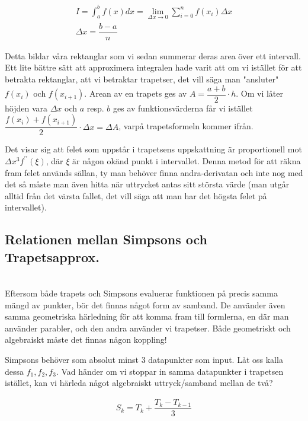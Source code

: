 \begin{equation*}
  \begin{gathered}
    I=\int_{a}^{b}f(x)dx=\lim_{\Delta x\to0}\sum_{i=0}^{n}f(x_i)\Delta x\\
    \Delta x = \dfrac{b-a}{n}
  \end{gathered}
\end{equation*}
\par\bigskip
\noindent Detta bildar våra rektanglar som vi sedan summerar deras area över ett intervall. Ett lite bättre sätt att approximera integralen hade varit att om vi istället för att betrakta rektanglar, att vi betraktar trapetser, det vill säga man "ansluter" $f(x_i)$ och $f(x_{i+1})$. Arean av en trapets ges av $A=\dfrac{a+b}{2}\cdot h$. Om vi låter höjden vara $\Delta x$ och $a$ resp. $b$ ges av funktionsvärderna får vi istället $\dfrac{f(x_i)+f(x_{i+1})}{2}\cdot\Delta x=\Delta A$, varpå trapetsformeln kommer ifrån. 
\par\bigskip
\noindent Det visar sig att felet som uppstår i trapetsens uppskattning är proportionell mot $\Delta x^3f^{\prime\prime}(\xi)$, där $\xi$ är någon okänd punkt i intervallet. Denna metod för att räkna fram felet används sällan, ty man behöver finna andra-derivatan och inte nog med det så måste man även hitta när uttrycket antas sitt största värde (man utgår alltid från det värsta fallet, det vill säga att man har det högsta felet på intervallet).
\par\bigskip

\subsection{Relationen mellan Simpsons och Trapetsapprox.}\hfill\\

\noindent Eftersom både trapets och Simpsons evaluerar funktionen på precis samma mängd av punkter, bör det finnas något form av samband. De använder även samma geometriska härledning för att komma fram till formlerna, en där man använder parabler, och den andra använder vi trapetser. Både geometriskt och algebraiskt måste det finnas någon koppling!
\par\bigskip
\noindent Simpsons behöver som absolut minst 3 datapunkter som input. Låt oss kalla dessa $f_1, f_2, f_3$. Vad händer om vi stoppar in samma datapunkter i trapetsen istället, kan vi härleda något algebraiskt uttryck/samband mellan de två?


\begin{equation*}
  \begin{gathered}
    S_k=T_k+\dfrac{T_k-T_{k-1}}{3}
  \end{gathered}
\end{equation*}
\pagebreak

